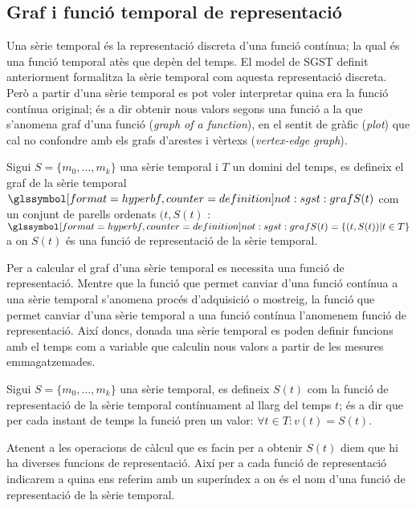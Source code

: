 \subsection{Graf i funció temporal de representació}
\label{sec:model:repr}

Una sèrie temporal és la representació discreta d'una funció contínua;
la qual és una funció temporal atès que depèn del temps. El model de
SGST definit anteriorment formalitza la sèrie temporal com aquesta
representació discreta. Però a partir d'una sèrie temporal es pot
voler interpretar quina era la funció contínua original; és a dir
obtenir nous valors segons una funció a la que s'anomena graf d'una
funció (\emph{graph of a function}), en el sentit de gràfic
(\emph{plot}) que cal no confondre amb els grafs d'arestes i vèrtexs
(\emph{vertex-edge graph}).

\begin{definition}%
  Sigui $S=\{m_0,\ldots,m_k\}$ una sèrie temporal i $T$ un domini del
  temps, es defineix el graf de la sèrie temporal
  $\glssymboldef{not:sgst:graf} S(t)$ com un conjunt de parells
  ordenats $(t,S(t)$ : $\glssymboldef{not:sgst:graf} S(t) = \{ (t,S(t)) |
  t\in T \}$ a on $S(t)$ és una funció de representació de la sèrie
  temporal.
\end{definition}

Per a calcular el graf d'una sèrie temporal es necessita una funció de
representació. Mentre que la funció que permet canviar d'una funció
contínua a una sèrie temporal s'anomena procés d'adquisició o
mostreig, la funció que permet canviar d'una sèrie temporal a una
funció contínua l'anomenem funció de representació.  Així doncs,
donada una sèrie temporal es poden definir funcions amb el temps com a
variable que calculin nous valors a partir de les mesures
emmagatzemades.
\begin{definition}
  Sigui $S=\{m_0,\ldots,m_k\}$ una sèrie temporal, es defineix $S(t)$
  com la funció de representació de la sèrie temporal contínuament al
  llarg del temps $t$; és a dir que per cada instant de temps la
  funció pren un valor: $\forall t\in T: v(t) = S(t)$. 

  Atenent a les operacions de càlcul que es facin per a obtenir $S(t)$
  diem que hi ha diverses funcions de representació. Així per a cada
  funció de representació indicarem a quina ens referim amb un
  superíndex  a on
   és el nom d'una funció de representació
  de la sèrie temporal.
\end{definition}

